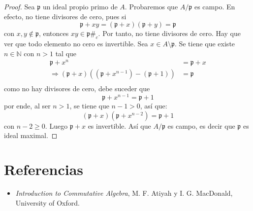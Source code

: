 \documentclass[12pt]{report}
\newcounter{it}
\theoremstyle{largebreak}
\newcommand\contradiction{\ensuremath{\#_c}}
\begin{document}
    \begin{proof}
        Sea $\mathfrak{p}$ un ideal propio primo de $A$. Probaremos que $A/\mathfrak{p}$ es campo. En efecto, no tiene divisores de cero, pues si
        \begin{equation*}
            \mathfrak{p}+xy=\left(\mathfrak{p}+x\right)\left(\mathfrak{p}+y\right)=\mathfrak{p}
        \end{equation*}
        con $x,y\notin\mathfrak{p}$, entonces $xy\in\mathfrak{p}$\contradiction. Por tanto, no tiene divisores de cero. Hay que ver que todo elemento no cero es invertible. Sea $x\in A\setminus\mathfrak{p}$. Se tiene que existe $n\in\mathbb{N}$ con $n>1$ tal que
        \begin{equation*}
            \begin{split}
                \mathfrak{p}+x^{n}&=\mathfrak{p}+x\\
                \Rightarrow \left(\mathfrak{p}+x\right)\left(\left(\mathfrak{p}+x^{ n-1}\right)-\left(\mathfrak{p}+1\right) \right)&=\mathfrak{p}\\
            \end{split}
        \end{equation*}
        como no hay divisores de cero, debe suceder que
        \begin{equation*}
            \mathfrak{p}+x^{ n-1}=\mathfrak{p}+1
        \end{equation*}
        por ende, al ser $n>1$, se tiene que $n-1>0$, así que:
        \begin{equation*}
            \left(\mathfrak{p}+x\right)\left(\mathfrak{p}+x^{ n-2}\right)=\mathfrak{p}+1
        \end{equation*}
        con $n-2\geq 0$. Luego $\mathfrak{p}+x$ es invertible. Así que $A/\mathfrak{p}$ es campo, es decir que $\mathfrak{p}$ es ideal maximal.
    \end{proof}

    

    \newpage

    \section{Referencias}

    \begin{itemize}
        \item \textit{Introduction to Commutative Algebra}, M. F. Atiyah y I. G. MacDonald, University of Oxford.
    \end{itemize}
     
\end{document}
